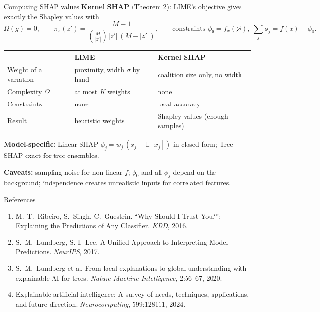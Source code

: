 \documentclass[aspectratio=169,11pt]{beamer}
\begin{document}
\begin{frame}{Computing SHAP values}
  \textbf{Kernel SHAP} (Theorem 2): LIME's objective gives exactly
  the Shapley values with
  {\small
  \[
    \Omega(g)=0,
    \qquad
    \pi_x(z')=\frac{M-1}{\binom{M}{|z'|}\,|z'|\,(M-|z'|)},
    \qquad
    \text{constraints } \phi_0=f_x(\varnothing),\ \textstyle\sum_j\phi_j=f(x)-\phi_0 .
  \]
  }

  \pause
  \vspace{-0.3em}
  \begin{center}
    \footnotesize
    \begin{tabular}{lll}
      \toprule
      & LIME & Kernel SHAP \\
      \midrule
      Weight of a variation & proximity, width $\sigma$ by hand
        & coalition size only, no width \\
      Complexity $\Omega$ & at most $K$ weights & none \\
      Constraints & none & local accuracy \\
      Result & heuristic weights & Shapley values (enough samples) \\
      \bottomrule
    \end{tabular}
  \end{center}

  \pause
  {\small
  \textbf{Model-specific:}
  Linear SHAP $\phi_j=w_j\,(x_j-\mathbb{E}[x_j])$ in closed form;
  Tree SHAP exact for tree ensembles.
  }

  \pause
  \vspace{0.3em}
  {\small
  \textbf{Caveats:} sampling noise for non-linear $f$; $\phi_0$ and all
  $\phi_j$ depend on the background; independence creates unrealistic
  inputs for correlated features.
  }
\end{frame}

\begin{frame}{References}
  \begin{enumerate}
    \item M.~T.~Ribeiro, S.~Singh, C.~Guestrin.
      ``Why Should I Trust You?'': Explaining the Predictions of Any
      Classifier. \emph{KDD}, 2016.

    \item S.~M.~Lundberg, S.-I.~Lee.
      A Unified Approach to Interpreting Model Predictions.
      \emph{NeurIPS}, 2017.

    \item S.~M.~Lundberg et al.
      From local explanations to global understanding with explainable
      AI for trees. \emph{Nature Machine Intelligence}, 2:56--67, 2020.

    \item Explainable artificial intelligence: A survey of needs,
      techniques, applications, and future direction.
      \emph{Neurocomputing}, 599:128111, 2024.
  \end{enumerate}
\end{frame}
\end{document}
